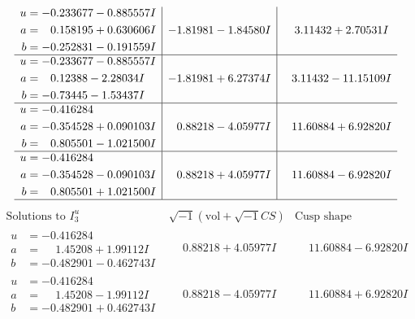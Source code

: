 \documentclass[1p]{elsarticle_modified}
\theoremstyle{definition}
\newcommand{\I}{\sqrt{-1}}
\begin{document}
$$\begin{array}{c|c|c}
\begin{aligned}
u &= -0.233677 - 0.885557 I \\
a &= \phantom{-}0.158195 + 0.630606 I \\
b &= -0.252831 - 0.191559 I\end{aligned}
 & -1.81981 - 1.84580 I & \phantom{-}3.11432 + 2.70531 I \\ \hline\begin{aligned}
u &= -0.233677 - 0.885557 I \\
a &= \phantom{-}0.12388 - 2.28034 I \\
b &= -0.73445 - 1.53437 I\end{aligned}
 & -1.81981 + 6.27374 I & \phantom{-}3.11432 - 11.15109 I \\ \hline\begin{aligned}
u &= -0.416284\phantom{ +0.000000I} \\
a &= -0.354528 + 0.090103 I \\
b &= \phantom{-}0.805501 - 1.021500 I\end{aligned}
 & \phantom{-}0.88218 - 4.05977 I & \phantom{-}11.60884 + 6.92820 I \\ \hline\begin{aligned}
u &= -0.416284\phantom{ +0.000000I} \\
a &= -0.354528 - 0.090103 I \\
b &= \phantom{-}0.805501 + 1.021500 I\end{aligned}
 & \phantom{-}0.88218 + 4.05977 I & \phantom{-}11.60884 - 6.92820 I\\
 \hline 
 \end{array}$$\newpage$$\begin{array}{c|c|c}  
\text{Solutions to }I^u_{3}& \I (\text{vol} + \sqrt{-1}CS) & \text{Cusp shape}\\
 \hline 
\begin{aligned}
u &= -0.416284\phantom{ +0.000000I} \\
a &= \phantom{-}1.45208 + 1.99112 I \\
b &= -0.482901 - 0.462743 I\end{aligned}
 & \phantom{-}0.88218 + 4.05977 I & \phantom{-}11.60884 - 6.92820 I \\ \hline\begin{aligned}
u &= -0.416284\phantom{ +0.000000I} \\
a &= \phantom{-}1.45208 - 1.99112 I \\
b &= -0.482901 + 0.462743 I\end{aligned}
 & \phantom{-}0.88218 - 4.05977 I & \phantom{-}11.60884 + 6.92820 I \\ \hline\begin{aligned}

\end{aligned}
\end{array}$$
\end{document}
